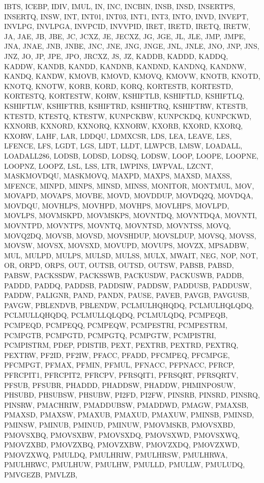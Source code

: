 {{IBTS, ICEBP, IDIV, IMUL, IN, INC, INCBIN, INSB, INSD, INSERTPS, INSERTQ, INSW,
INT, INT01, INT03, INT1, INT3, INTO, INVD, INVEPT, INVLPG, INVLPGA, INVPCID,
INVVPID, IRET, IRETD, IRETQ, IRETW, JA, JAE, JB, JBE, JC, JCXZ, JE, JECXZ, JG,
JGE, JL, JLE, JMP, JMPE, JNA, JNAE, JNB, JNBE, JNC, JNE, JNG, JNGE, JNL, JNLE,
JNO, JNP, JNS, JNZ, JO, JP, JPE, JPO, JRCXZ, JS, JZ, KADDB, KADDD, KADDQ, KADDW,
KANDB, KANDD, KANDNB, KANDND, KANDNQ, KANDNW, KANDQ, KANDW, KMOVB, KMOVD, KMOVQ,
KMOVW, KNOTB, KNOTD, KNOTQ, KNOTW, KORB, KORD, KORQ, KORTESTB, KORTESTD,
KORTESTQ, KORTESTW, KORW, KSHIFTLB, KSHIFTLD, KSHIFTLQ, KSHIFTLW, KSHIFTRB,
KSHIFTRD, KSHIFTRQ, KSHIFTRW, KTESTB, KTESTD, KTESTQ, KTESTW, KUNPCKBW,
KUNPCKDQ, KUNPCKWD, KXNORB, KXNORD, KXNORQ, KXNORW, KXORB, KXORD, KXORQ, KXORW,
LAHF, LAR, LDDQU, LDMXCSR, LDS, LEA, LEAVE, LES, LFENCE, LFS, LGDT, LGS, LIDT,
LLDT, LLWPCB, LMSW, LOADALL, LOADALL286, LODSB, LODSD, LODSQ, LODSW, LOOP,
LOOPE, LOOPNE, LOOPNZ, LOOPZ, LSL, LSS, LTR, LWPINS, LWPVAL, LZCNT, MASKMOVDQU,
MASKMOVQ, MAXPD, MAXPS, MAXSD, MAXSS, MFENCE, MINPD, MINPS, MINSD, MINSS,
MONITOR, MONTMUL, MOV, MOVAPD, MOVAPS, MOVBE, MOVD, MOVDDUP, MOVDQ2Q, MOVDQA,
MOVDQU, MOVHLPS, MOVHPD, MOVHPS, MOVLHPS, MOVLPD, MOVLPS, MOVMSKPD, MOVMSKPS,
MOVNTDQ, MOVNTDQA, MOVNTI, MOVNTPD, MOVNTPS, MOVNTQ, MOVNTSD, MOVNTSS, MOVQ,
MOVQ2DQ, MOVSB, MOVSD, MOVSHDUP, MOVSLDUP, MOVSQ, MOVSS, MOVSW, MOVSX, MOVSXD,
MOVUPD, MOVUPS, MOVZX, MPSADBW, MUL, MULPD, MULPS, MULSD, MULSS, MULX, MWAIT,
NEG, NOP, NOT, OR, ORPD, ORPS, OUT, OUTSB, OUTSD, OUTSW, PABSB, PABSD, PABSW,
PACKSSDW, PACKSSWB, PACKUSDW, PACKUSWB, PADDB, PADDD, PADDQ, PADDSB, PADDSIW,
PADDSW, PADDUSB, PADDUSW, PADDW, PALIGNR, PAND, PANDN, PAUSE, PAVEB, PAVGB,
PAVGUSB, PAVGW, PBLENDVB, PBLENDW, PCLMULHQHQDQ, PCLMULHQLQDQ, PCLMULLQHQDQ,
PCLMULLQLQDQ, PCLMULQDQ, PCMPEQB, PCMPEQD, PCMPEQQ, PCMPEQW, PCMPESTRI,
PCMPESTRM, PCMPGTB, PCMPGTD, PCMPGTQ, PCMPGTW, PCMPISTRI, PCMPISTRM, PDEP,
PDISTIB, PEXT, PEXTRB, PEXTRD, PEXTRQ, PEXTRW, PF2ID, PF2IW, PFACC, PFADD,
PFCMPEQ, PFCMPGE, PFCMPGT, PFMAX, PFMIN, PFMUL, PFNACC, PFPNACC, PFRCP,
PFRCPIT1, PFRCPIT2, PFRCPV, PFRSQIT1, PFRSQRT, PFRSQRTV, PFSUB, PFSUBR, PHADDD,
PHADDSW, PHADDW, PHMINPOSUW, PHSUBD, PHSUBSW, PHSUBW, PI2FD, PI2FW, PINSRB,
PINSRD, PINSRQ, PINSRW, PMACHRIW, PMADDUBSW, PMADDWD, PMAGW, PMAXSB, PMAXSD,
PMAXSW, PMAXUB, PMAXUD, PMAXUW, PMINSB, PMINSD, PMINSW, PMINUB, PMINUD, PMINUW,
PMOVMSKB, PMOVSXBD, PMOVSXBQ, PMOVSXBW, PMOVSXDQ, PMOVSXWD, PMOVSXWQ, PMOVZXBD,
PMOVZXBQ, PMOVZXBW, PMOVZXDQ, PMOVZXWD, PMOVZXWQ, PMULDQ, PMULHRIW, PMULHRSW,
PMULHRWA, PMULHRWC, PMULHUW, PMULHW, PMULLD, PMULLW, PMULUDQ, PMVGEZB, PMVLZB,
}}
